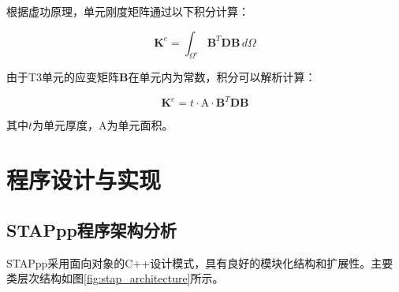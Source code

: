 \documentclass[12pt,a4paper]{article}
\newcommand{\A}{\mathrm{A}}           %
\begin{document}
根据虚功原理，单元刚度矩阵通过以下积分计算：

\begin{equation}
\boldsymbol{K}^e = \int_{\Omega^e} \boldsymbol{B}^T \boldsymbol{D} \boldsymbol{B} \,d\Omega
\end{equation}

由于T3单元的应变矩阵$\boldsymbol{B}$在单元内为常数，积分可以解析计算：

\begin{equation}
\boldsymbol{K}^e = t \cdot \A \cdot \boldsymbol{B}^T \boldsymbol{D} \boldsymbol{B}
\end{equation}

其中$t$为单元厚度，$\A$为单元面积。

\section{程序设计与实现}

\subsection{STAPpp程序架构分析}

STAPpp采用面向对象的C++设计模式，具有良好的模块化结构和扩展性。主要类层次结构如图\ref{fig:stap_architecture}所示。

\end{document}
